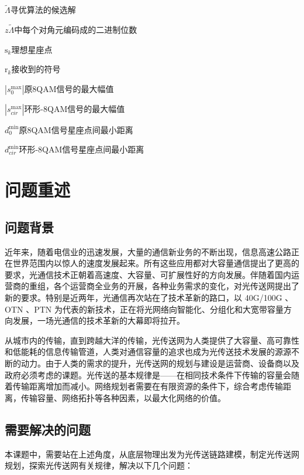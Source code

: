 \documentclass[bwprint]{gmcmthesis}
\numberwithin{equation}{section}
\begin{document}
\begin{multicols}{2}
	$\widetilde{\Lambda}$\quad 寻优算法的候选解
	
	$z$\quad $\tilde{\Lambda}$中每个对角元编码成的二进制位数 
	
	$\mathrm{s}_{k}$\quad 理想星座点
	
	$\mathrm{r}_{k}$\quad 接收到的符号
	
	$\left|s_{0}^{\max }\right|$\quad 原8QAM信号的最大幅值
	
	$\left|s_{c i r}^{\max }\right|$\quad 环形-8QAM信号的最大幅值
	
	$d_{0}^{\min }$\quad 原8QAM信号星座点间最小距离
	
	$d_{cir}^{\min }$\quad 环形-8QAM信号星座点间最小距离
	
\end{multicols}

\newpage

\section{问题重述}


\subsection{问题背景}

近年来，随着电信业的迅速发展，大量的通信新业务的不断出现，信息高速公路正在世界范围内以惊人的速度发展起来。所有这些应用都对大容量通信提出了更高的要求，光通信技术正朝着高速度、大容量、可扩展性好的方向发展。伴随着国内运营商的重组，各个运营商全业务的开展，各种业务需求的变化，对光传送网提出了新的要求。特别是近两年，光通信再次站在了技术革新的路口，以 40G/100G 、OTN 、PTN 为代表的新技术，正在将光网络向智能化、分组化和大宽带容量方向发展，一场光通信的技术革新的大幕即将拉开。

从城市内的传输，直到跨越大洋的传输，光传送网为人类提供了大容量、高可靠性和低能耗的信息传输管道，人类对通信容量的追求也成为光传送技术发展的源源不断的动力。由于人类的需求的提升，光传送网的规划与建设是运营商、设备商以及政府必须考虑的课题。光传送的基本规律是——在相同技术条件下传输的容量会随着传输距离增加而减小。网络规划者需要在有限资源的条件下，综合考虑传输距离，传输容量、网络拓扑等各种因素，以最大化网络的价值。


\subsection{需要解决的问题}

本课题中，需要站在上述角度，从底层物理出发为光传送链路建模，制定光传送网规划，探索光传送网有关规律，解决以下几个问题：
\end{document}
